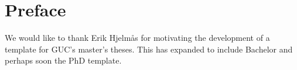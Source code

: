 \chapter*{Preface} %
\label{chap:preface}

We would like to thank Erik Hjelm\aa{}s for motivating the development of a \Latex{} template
 for GUC's master's theses.  This has expanded to include Bachelor and perhaps soon the PhD 
 template.
 
 

